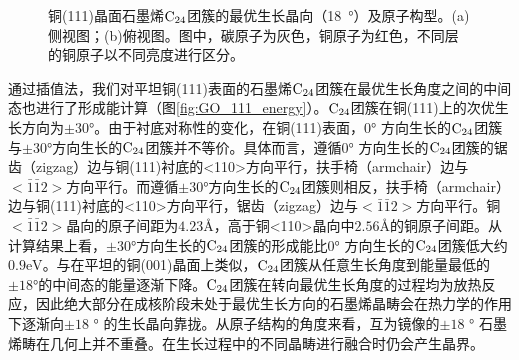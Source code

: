         \begin{figure}[htb]

            \caption{铜(111)晶面石墨烯$\rm{C_{24}}$团簇的最优生长晶向（\SI{18}  {\degree}）及原子构型。(a)侧视图；(b)俯视图。图中，碳原子为灰色，铜原子为红色，不同层的铜原子以不同亮度进行区分。
            }

            \label{fig:GO_111_structure}
        \end{figure}

        通过插值法，我们对平坦铜(111)表面的石墨烯$\rm{C_{24}}$团簇在最优生长角度之间的中间态也进行了形成能计算（图\ref{fig:GO_111_energy}）。$\rm{C_{24}}$团簇在铜(111)上的次优生长方向为$\pm 30$\si{\degree}。由于衬底对称性的变化，在铜(111)表面，$0\si{\degree}$ 方向生长的$\rm{C_{24}}$团簇与$\pm 30\si{\degree}$方向生长的$\rm{C_{24}}$团簇并不等价。具体而言，遵循$0\si{\degree}$ 方向生长的$\rm{C_{24}}$团簇的锯齿（zigzag）边与铜(111)衬底的<110>方向平行，扶手椅（armchair）边与$<\bar{1}\bar{1}2>$方向平行。而遵循$\pm 30\si{\degree}$方向生长的$\rm{C_{24}}$团簇则相反，扶手椅（armchair）边与铜(111)衬底的<110>方向平行，锯齿（zigzag）边与$<\bar{1}\bar{1}2>$方向平行。铜$<\bar{1}\bar{1}2>$晶向的原子间距为$4.23 \si{\angstrom}$，高于铜<110>晶向中$2.56 \si{\angstrom}$的铜原子间距。从计算结果上看，$\pm 30\si{\degree}$方向生长的$\rm{C_{24}}$团簇的形成能比$0\si{\degree}$ 方向生长的$\rm{C_{24}}$团簇低大约$0.9\si{\electronvolt}$。与在平坦的铜(001)晶面上类似，$\rm{C_{24}}$团簇从任意生长角度到能量最低的$\pm 18 \si{\degree}$的中间态的能量逐渐下降。$\rm{C_{24}}$团簇在转向最优生长角度的过程均为放热反应，因此绝大部分在成核阶段未处于最优生长方向的石墨烯晶畴会在热力学的作用下逐渐向$\pm 18$ \si{\degree} 的生长晶向靠拢。从原子结构的角度来看，互为镜像的$\pm 18$ \si{\degree} 石墨烯畴在几何上并不重叠。在生长过程中的不同晶畴进行融合时仍会产生晶界。

